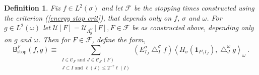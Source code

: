 \documentclass{amsart}%
\theoremstyle{plain}
\newtheorem{definition}[theorem]{Definition}
\numberwithin{equation}{section}
\begin{document}
\begin{definition}
Fix $f\in L^{2}\left(  \sigma\right)  $ and let $\mathcal{F}$ be the stopping
times constructed using the criterion (\ref{energy stop crit}), that depends
only on $f$, $\sigma$ and $\omega$. For $g\in L^{2}\left(  \omega\right)  $
let $\mathcal{U}\left[  F\right]  =\mathcal{U}_{\Lambda_{g}^{\omega}}\left[
F\right]  ,F\in\mathcal{F}$ be as constructed above, depending only on $g$ and
$\omega$. Then for $F\in\mathcal{F}$, define the form,
\[
\mathsf{B}_{\operatorname*{stop}}^{F}\left(  f,g\right)  \equiv\sum
_{\substack{I\in\mathcal{C}_{F}\text{ and }J\in\mathcal{C}_{\mathcal{F}%
}\left(  F\right)  \\J\subset I\text{ and }\ell\left(  J\right)  \leq2^{-\tau
}\ell\left(  I\right)  }}\left(  E_{I_{J}}^{\sigma}\bigtriangleup_{I}^{\sigma
}f\right)  \left\langle H_{\sigma}\left(  \mathbf{1}_{F\setminus I_{J}%
}\right)  ,\bigtriangleup_{J}^{\omega}g\right\rangle _{\omega}\ .
\]

\end{definition}
\end{document}
